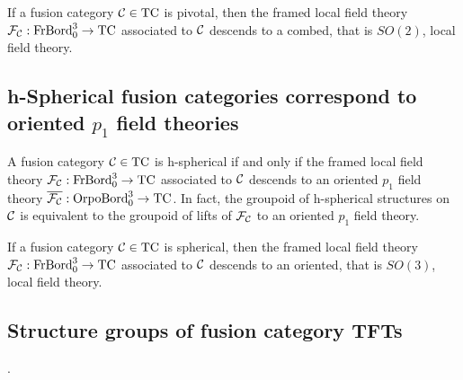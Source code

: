 \documentclass{amsart}
\begin{document}
\begin{conjecture}
If a fusion category $\mathcal C \in \mathrm{TC}$ is pivotal, then the framed local field theory $\mathcal F_{\mathcal C} : \mathrm{FrBord}_0^3 \rightarrow \mathrm{TC}$ associated to $\mathcal C$ descends to a combed, that is $SO(2)$, local field theory.
\end{conjecture}


\subsection{h-Spherical fusion categories correspond to oriented $p_1$ field theories}

\begin{theorem}
A fusion category $\mathcal C \in \mathrm{TC}$ is h-spherical if and only if the framed local field theory $\mathcal F_{\mathcal C} : \mathrm{FrBord}_0^3 \rightarrow \mathrm{TC}$ associated to $\mathcal C$ descends to an oriented $p_1$ field theory $\overline{\mathcal F_{\mathcal C}} : \mathrm{OrpoBord}_0^3 \rightarrow \mathrm{TC}$.  In fact, the groupoid of h-spherical structures on $\mathcal C$ is equivalent to the groupoid of lifts of $\mathcal F_{\mathcal C}$ to an oriented $p_1$ field theory.
\end{theorem}

\begin{conjecture}
If a fusion category $\mathcal C \in \mathrm{TC}$ is spherical, then the framed local field theory $\mathcal F_{\mathcal C} : \mathrm{FrBord}_0^3 \rightarrow \mathrm{TC}$ associated to $\mathcal C$ descends to an oriented, that is $SO(3)$, local field theory.
\end{conjecture}





\subsection{Structure groups of fusion category TFTs} \label{sec-pivot-struc}
.
\end{document}
